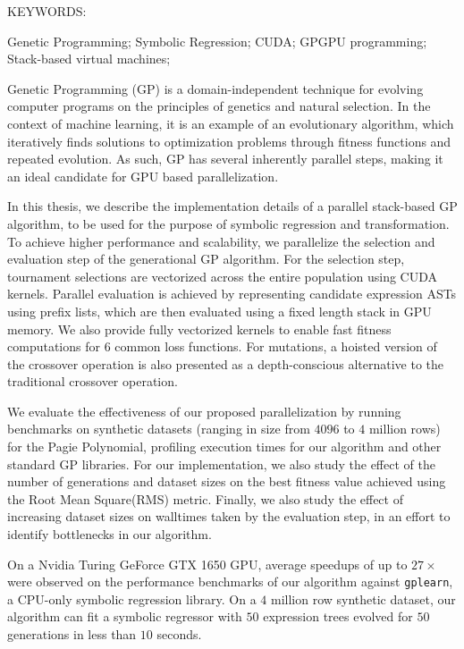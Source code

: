 \abstract

\noindent KEYWORDS: \hspace*{0.5em} 
\parbox[t]{4.4in}{  
  Genetic Programming;
	Symbolic Regression; 
  CUDA;
  GPGPU programming; 
  Stack-based virtual machines; 
}

\vspace*{24pt}

\noindent Genetic Programming (GP) is a domain-independent technique for evolving computer programs on the principles of genetics and natural selection. In the context of machine learning, it is an example of an evolutionary algorithm, which iteratively finds solutions to optimization problems through fitness functions and repeated evolution. As such, GP has several inherently parallel steps, making it an ideal candidate for GPU based parallelization. 

In this thesis, we describe the implementation details of a parallel stack-based GP algorithm, to be used for the purpose of symbolic regression and transformation. To achieve higher performance and scalability, we parallelize the selection and evaluation step of the generational GP algorithm. 
For the selection step, tournament selections are vectorized across the entire population using CUDA kernels. 
Parallel evaluation is achieved by representing candidate expression ASTs using prefix lists, which are then evaluated using a fixed length stack in GPU memory.
We also provide fully vectorized kernels to enable fast fitness computations for $6$ common loss functions. For mutations, a hoisted version of the crossover operation is also presented as a depth-conscious alternative to the traditional crossover operation.

We evaluate the effectiveness of our proposed parallelization by running benchmarks on synthetic datasets (ranging in size from $4096$ to $4$ million rows) for the Pagie Polynomial, profiling execution times for our algorithm and other standard GP libraries. For our implementation, we also study the effect of the number of generations and dataset sizes on the best fitness value achieved using the Root Mean Square(RMS) metric. Finally, we also study the effect of increasing dataset sizes on walltimes taken by the evaluation step, in an effort to identify bottlenecks in our algorithm.

On a Nvidia Turing GeForce GTX 1650 GPU, average speedups of up to $27\times$ were observed on the performance benchmarks of our algorithm against \texttt{gplearn}, a CPU-only symbolic regression library. On a $4$ million row synthetic dataset, our algorithm can fit a symbolic regressor with $50$ expression trees evolved for $50$ generations in less than $10$ seconds. 

